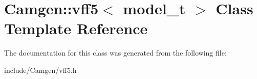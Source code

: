 \hypertarget{a00568}{\section{Camgen\-:\-:vff5$<$ model\-\_\-t $>$ Class Template Reference}
\label{a00568}
}


The documentation for this class was generated from the following file\-:\begin{DoxyCompactItemize}
\item 
include/\-Camgen/vff5.\-h\end{DoxyCompactItemize}

